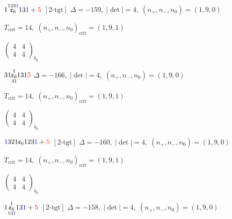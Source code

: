 \documentclass[10pt]{article}
\begin{document}
\smallskip

$1\overset{123\textcolor{blue}{1}}{\mathfrak{e}_6}13\textcolor{blue}{1}+\textcolor{red}{5}$ $\scriptstyle [2\text{-tgt}]$ \quad $\Delta=-159,\; |\det|=4,\; (n_+,n_-,n_0)=(1,9,0)$

\hspace{1em}$T_{\text{crit}}=14,\; (n_+,n_-,n_0)_{\text{crit}}=(1,9,1)$

\hspace{2em}$\left(\begin{smallmatrix}4 & 4 \\ 4 & 4\end{smallmatrix}\right)_{\!b_0}$

\smallskip

$31\overset{1}{\underset{31}{\mathfrak{e}_6}}131\textcolor{red}{5}$ \quad $\Delta=-166,\; |\det|=4,\; (n_+,n_-,n_0)=(1,9,0)$

\hspace{1em}$T_{\text{crit}}=14,\; (n_+,n_-,n_0)_{\text{crit}}=(1,9,1)$

\hspace{2em}$\left(\begin{smallmatrix}4 & 4 \\ 4 & 4\end{smallmatrix}\right)_{\!b_0}$

\smallskip

$\textcolor{blue}{1}321\mathfrak{e}_6123\textcolor{blue}{1}+\textcolor{red}{5}$ $\scriptstyle [2\text{-tgt}]$ \quad $\Delta=-160,\; |\det|=4,\; (n_+,n_-,n_0)=(1,9,0)$

\hspace{1em}$T_{\text{crit}}=14,\; (n_+,n_-,n_0)_{\text{crit}}=(1,9,1)$

\hspace{2em}$\left(\begin{smallmatrix}4 & 4 \\ 4 & 4\end{smallmatrix}\right)_{\!b_0}$

\smallskip

$1\overset{1}{\underset{13\textcolor{blue}{1}}{\mathfrak{e}_6}}13\textcolor{blue}{1}+\textcolor{red}{5}$ $\scriptstyle [2\text{-tgt}]$ \quad $\Delta=-158,\; |\det|=4,\; (n_+,n_-,n_0)=(1,9,0)$
\end{document}

